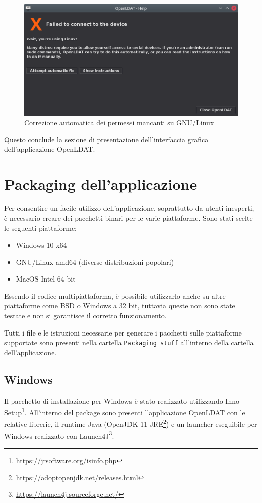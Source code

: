 \begin{figure}[H]
	\centering
	\includegraphics[width=\textwidth]{Applicazione_files/gui_linuxerror.png}
	\caption{Correzione automatica dei permessi mancanti su GNU/Linux}
	\label{fig:gui_linuxerror}
\end{figure}

Questo conclude la sezione di presentazione dell'interfaccia grafica dell'applicazione OpenLDAT.

\section{Packaging dell'applicazione}
Per consentire un facile utilizzo dell'applicazione, soprattutto da utenti inesperti, è necessario creare dei pacchetti binari per le varie piattaforme. Sono stati scelte le seguenti piattaforme:\begin{itemize}
	\item Windows 10 x64
	\item GNU/Linux amd64 (diverse distribuzioni popolari)
	\item MacOS Intel 64 bit
\end{itemize}
Essendo il codice multipiattaforma, è possibile utilizzarlo anche su altre piattaforme come BSD o Windows a 32 bit, tuttavia queste non sono state testate e non si garantisce il corretto funzionamento.

Tutti i file e le istruzioni necessarie per generare i pacchetti sulle piattaforme supportate sono presenti nella cartella \texttt{Packaging stuff} all'interno della cartella dell'applicazione.

\subsection{Windows}
Il pacchetto di installazione per Windows è stato realizzato utilizzando Inno Setup\footnote{\url{https://jrsoftware.org/isinfo.php}}. All'interno del package sono presenti l'applicazione OpenLDAT con le relative librerie, il runtime Java (OpenJDK 11 JRE\footnote{\url{https://adoptopenjdk.net/releases.html}}) e un launcher eseguibile per Windows realizzato con Launch4J\footnote{\url{https://launch4j.sourceforge.net/}}.

